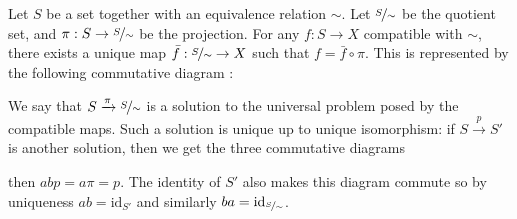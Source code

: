 \documentclass{article}
\newcommand{\id}{\mathrm{id}}
\theoremstyle{plain}
\theoremstyle{definition}
\theoremstyle{remark}
\begin{document}
\faChevronRight \space Let $S$ be a set together with an equivalence relation $\sim$. Let $\nicefrac{S}{\sim}$ be the quotient set, and $\pi : S \to \nicefrac{S}{\sim}$ be the projection. For any $f : S \to X$ compatible with $\sim$, there exists a unique map $\bar{f} : \nicefrac{S}{\sim} \to X$ such that $f = \bar{f} \circ \pi$. This is represented by the following commutative diagram : \begin{center}\end{center}
We say that $S \xrightarrow{\pi} \nicefrac{S}{\sim}$ is a solution to the universal problem posed by the compatible maps. Such a solution is unique up to unique isomorphism: if $S \xrightarrow{p} S'$ is another solution, then we get the three commutative diagrams
\begin{center}
\end{center}
then $abp = a\pi = p$. The identity of $S'$ also makes this diagram commute so by uniqueness $ab = \id_{S'}$ and similarly $ba = \id_{\nicefrac{S}{\sim}}$.
\end{document}
